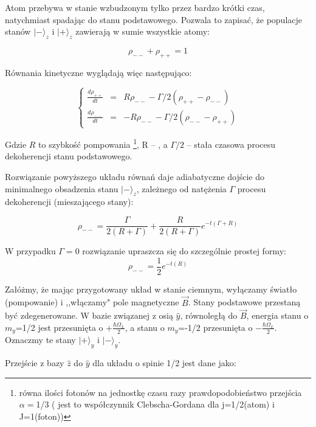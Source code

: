 \documentclass[a4paper,10pt,twoside]{report}
\begin{document}
Atom przebywa w stanie wzbudzonym tylko przez bardzo krótki czas, natychmiast spadając do stanu podstawowego. Pozwala to zapisać, że populacje stanów $\lvert - \rangle_z$ i $\lvert + \rangle_z$ zawierają w sumie wszystkie atomy:

\begin{equation}
\rho_{--}+\rho_{++}=1
\end{equation}

Równania kinetyczne wyglądają więc następująco:


\begin{equation}
\left\{
\begin{array}{rcl}
\frac{d \rho_{++}}{d t} &=&  R \rho_{--} - \Gamma/2 (\rho_{++}- \rho_{--} )\\
\frac{d \rho_{--}}{d t} &=&- R \rho_{--} - \Gamma/2(\rho_{--}- \rho_{++} )
\end{array}
\right.
\end{equation}




Gdzie $R$ to szybkość pompowania \footnote{równa ilości fotonów na jednostkę czasu razy prawdopodobieństwo przejścia  $\alpha=$1/3 ( jest to współczynnik Clebscha-Gordana dla j=1/2(atom) i J=1(foton))}, R -- , a $\Gamma/2$ -- stała czasowa procesu dekoherencji stanu podstawowego.

Rozwiązanie powyższego układu równań daje adiabatyczne dojście do minimalnego obsadzenia stanu $\lvert - \rangle_z$, zależnego od natężenia $\Gamma$ procesu dekoherencji (mieszającego stany): \nopagebreak

\begin{equation}
\rho_{--}=\frac{\Gamma}{2(R+\Gamma)} + \frac{R}{2 (R+\Gamma)} e^{-t (\Gamma + R)}
\end{equation}

W przypadku $\Gamma=0$ rozwiązanie upraszcza się do szczególnie prostej formy:
\begin{equation}
\rho_{--}= \frac{1}{2} e^{-t ( R)}
\end{equation} 
 
Załóżmy, że mając przygotowany układ w stanie ciemnym, wyłączamy światło (pompowanie) i ,,włączamy" pole magnetyczne $\vec B$.
Stany podstawowe przestaną być zdegenerowane. W bazie związanej z osią $\hat y$, równoległą do $\vec B$, energia stanu o $m_y$=1/2 jest przesunięta o $+\frac{\hbar \Omega_L}{2}$, a stanu o $m_y$=-1/2 przesunięta o $-\frac{\hbar \Omega_L}{2}$. Oznaczmy te stany $\lvert + \rangle_y$ i $\lvert - \rangle_y$.

Przejście z bazy $\hat z$ do $\hat y$ dla układu o spinie 1/2 jest dane jako:
\end{document}

